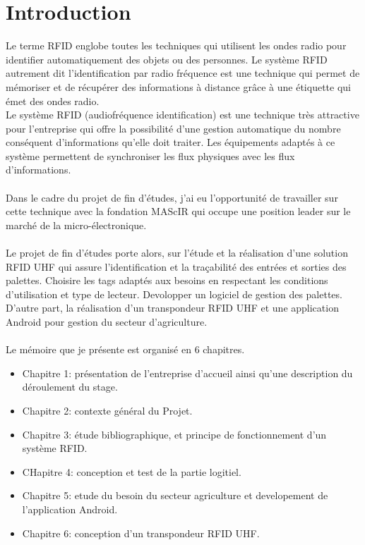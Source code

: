 \documentclass[11pt, a4paper, twoside]{book}
\begin{document}
\listoffigures

\listoftables

\chapter*{Introduction}
Le terme RFID englobe toutes les techniques qui utilisent les ondes radio pour identifier automatiquement des objets ou des personnes.
Le système RFID autrement dit l'identification par radio fréquence est une technique qui permet de mémoriser et de récupérer des informations à distance grâce à une étiquette qui émet des ondes radio.\\
Le système RFID (audiofréquence identification) est une technique très attractive pour l'entreprise qui offre la possibilité d'une gestion automatique du nombre conséquent d'informations qu'elle doit traiter. Les équipements adaptés à ce système permettent de synchroniser les flux physiques avec les flux d'informations.\\\\
Dans le cadre du projet de fin d'études, j'ai eu l'opportunité de travailler sur cette technique avec la fondation MAScIR qui occupe une position leader sur le marché de la micro-électronique.\\\\
Le projet de fin d’études porte alors, sur l'étude et la réalisation d’une solution RFID UHF qui assure l’identification et la traçabilité des entrées et sorties des palettes. Choisire les tags adaptés aux besoins en respectant les conditions d’utilisation et type de lecteur. Devolopper un logiciel de gestion des palettes. D’autre part, la réalisation d’un transpondeur RFID UHF et une application Android pour gestion du secteur d'agriculture.\\\\
Le mémoire que je présente est organisé en 6 chapitres.

\begin{itemize}
\item Chapitre 1: présentation de l'entreprise d'accueil ainsi qu'une description du déroulement du stage.
\item Chapitre 2: contexte général du Projet.
\item Chapitre 3: étude bibliographique, et principe de fonctionnement d’un système RFID. 
\item CHapitre 4: conception et test de la partie logitiel.
\item Chapitre 5: etude du besoin du secteur agriculture et developement de l'application Android.
\item Chapitre 6: conception d'un transpondeur RFID UHF.
\end{itemize}
\end{document}
